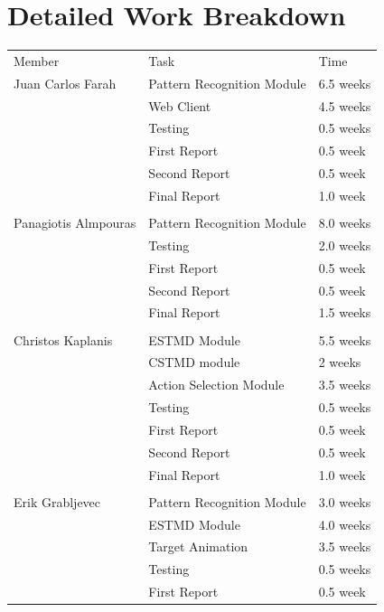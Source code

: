 \documentclass[a4paper,11pt]{article}
\begin{document}
\clearpage
\section{Detailed Work Breakdown}

\begin{table}[h]
\centering
\begin{tabular}{|l|l|l|}
\cline{1-3}
Member& Task&  Time  \\ \cline{1-3}
 Juan Carlos Farah&  Pattern Recognition Module&  6.5 weeks  \\ \cline{1-3}
&  Web Client&  4.5 weeks  \\ \cline{1-3}
& Testing& 0.5 weeks \\ \cline{1-3}
&  First Report&  0.5 week  \\ \cline{1-3}
&  Second Report&  0.5 week  \\ \cline{1-3}
&  Final Report& 1.0 week   \\ \cline{1-3}
&  &    \\ \cline{1-3}
Panagiotis Almpouras&  Pattern Recognition Module& 8.0 weeks  \\ \cline{1-3}
&  Testing&  2.0 weeks  \\ \cline{1-3}
&  First Report&  0.5 week  \\ \cline{1-3}
&  Second Report&  0.5 week  \\ \cline{1-3}
&  Final Report&  1.5 weeks  \\ \cline{1-3}
&  &    \\ \cline{1-3}
 Christos Kaplanis&  ESTMD Module&  5.5 weeks  \\ \cline{1-3}
&  CSTMD module& 2 weeks    \\ \cline{1-3}
&  Action Selection Module&  3.5 weeks  \\ \cline{1-3}
& Testing& 0.5 weeks \\ \cline{1-3}
&  First Report&  0.5 week  \\ \cline{1-3}
&  Second Report&  0.5 week  \\ \cline{1-3}
&  Final Report&  1.0 week  \\ \cline{1-3}
&  &   \\ \cline{1-3}
Erik Grabljevec&  Pattern Recognition Module&  3.0 weeks  \\ \cline{1-3}
&  ESTMD Module&  4.0 weeks  \\ \cline{1-3}
&  Target Animation&  3.5 weeks  \\ \cline{1-3}
& Testing& 0.5 weeks \\ \cline{1-3}
&  First Report& 0.5 week  \\ \cline{1-3}

\end{tabular}
\end{table}
\end{document}
